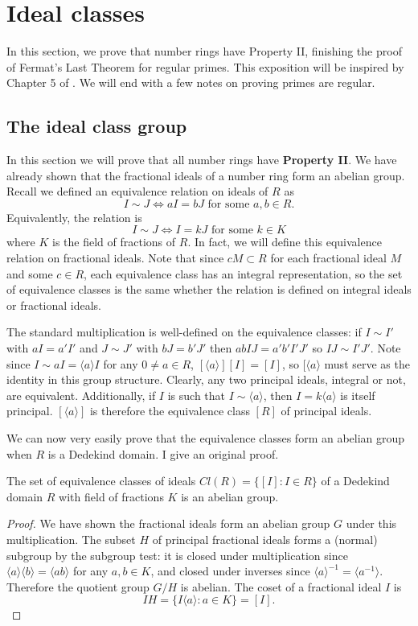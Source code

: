 \chapter{Ideal classes}\label{sec-regular-primes}
In this section, we prove that number rings have Property II, finishing the proof of Fermat's Last Theorem for regular primes. This exposition will be inspired by Chapter 5 of \cite{NumberFields}. We will end with a few notes on proving primes are regular. 

\section{The ideal class group}
In this section we will prove that all number rings have \textbf{Property II}.  We have already shown that the fractional ideals of a number ring form an abelian group. Recall we defined an equivalence relation on ideals of $R$ as $$I\sim J\iff aI=bJ\text{ for some }a,b\in R.$$
Equivalently, the relation is $$I\sim J \iff I=kJ \text{ for some } k\in K$$ where $K$ is the field of fractions of $R$. In fact, we will define this equivalence relation on fractional ideals. Note that since $cM\subset R$ for each fractional ideal $M$ and some $c\in R$, each equivalence class has an integral representation, so the set of equivalence classes is the same whether the relation is defined on integral ideals or fractional ideals.

The standard multiplication is well-defined on the equivalence classes: if $I\sim I'$ with $aI=a'I'$ and $J\sim J'$ with $bJ=b'J'$ then $abIJ=a'b'I'J'$ so $IJ\sim I'J'$. Note since $I\sim aI=\langle a\rangle I$ for any $0\neq a\in R$, $[\langle a \rangle][I]=[I]$, so $[\langle a \rangle$ must serve as the identity in this group structure. 
Clearly, any two principal ideals, integral or not, are equivalent. Additionally, if $I$ is such that $I \sim \langle a \rangle$, then $I=k\langle a\rangle$ is itself principal. $[\langle a \rangle]$ is therefore the equivalence class $[R]$ of principal ideals. 

We can now very easily prove that the equivalence classes form an abelian group when $R$ is a Dedekind domain. I give an original proof.

\begin{prop}
The set of equivalence classes of ideals  $Cl(R)=\{[I]:I\in R\}$ of a Dedekind domain $R$ with field of fractions $K$ is an abelian group.
\end{prop}
\begin{proof}
We have shown the fractional ideals form an abelian group $G$ under this multiplication. The subset $H$ of principal fractional ideals forms a (normal) subgroup by the subgroup test: it is closed under multiplication since $\langle a \rangle \langle b \rangle= \langle ab\rangle$ for any $a,b\in K$, and closed under inverses since $\langle a \rangle^{-1}=\langle a^{-1}\rangle.$ Therefore the quotient group $G/H$ is abelian. The coset of a fractional ideal $I$ is $$IH=\{I\langle a\rangle :a\in K\}= [I].$$
\end{proof}

